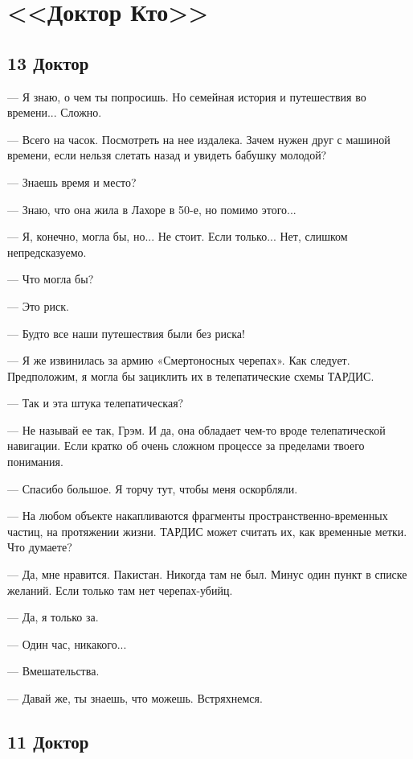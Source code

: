 \documentclass{bmstu}
\begin{document}
\section*{<<Доктор Кто>>}

\subsection*{13 Доктор}

— Я знаю, о чем ты попросишь. Но семейная история и путешествия во времени...
Сложно.

— Всего на часок. Посмотреть на нее издалека. Зачем нужен друг с машиной
времени, если нельзя слетать назад и увидеть бабушку молодой?

— Знаешь время и место?

— Знаю, что она жила в Лахоре в 50-е, но помимо этого...

— Я, конечно, могла бы, но... Не стоит. Если только... Нет, слишком
непредсказуемо.

— Что могла бы?

— Это риск.

— Будто все наши путешествия были без риска!

— Я же извинилась за армию «Смертоносных черепах». Как следует. Предположим, я
могла бы зациклить их в телепатические схемы ТАРДИС.

— Так и эта штука телепатическая?

— Не называй ее так, Грэм. И да, она обладает чем-то вроде телепатической
навигации. Если кратко об очень сложном процессе за пределами твоего понимания.

— Спасибо большое. Я торчу тут, чтобы меня оскорбляли.

— На любом объекте накапливаются фрагменты пространственно-временных частиц, на
протяжении жизни. ТАРДИС может считать их, как временные метки. Что думаете?

— Да, мне нравится. Пакистан. Никогда там не был. Минус один пункт в списке
желаний. Если только там нет черепах-убийц.

— Да, я только за.

— Один час, никакого...

— Вмешательства.

— Давай же, ты знаешь, что можешь. Встряхнемся.

\subsection*{11 Доктор}
\end{document}
